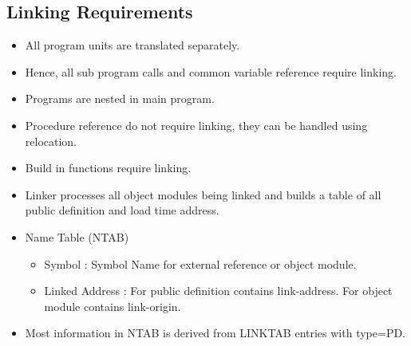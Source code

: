 \documentclass[a4paper,12pt]{extarticle}
\begin{document}
    \subsection{Linking Requirements}
\begin{itemize}
	\item All program units are translated separately.
	\item Hence, all sub program calls and common variable reference require linking.
	\item Programs are nested in main program.
	\item Procedure reference do not require linking, they can be handled using relocation.
	\item Build in functions require linking.
	\item Linker processes all object modules being linked and builds a table of all public definition and load time address.
	\item Name Table (NTAB)
	\begin{itemize}
		\item Symbol : Symbol Name for external reference or object module.
		\item Linked Address : For public definition contains link-address. For object module contains link-origin.
	\end{itemize}
	\item Most information in NTAB is derived from LINKTAB entries with type=PD.
\end{itemize}
\end{document}
